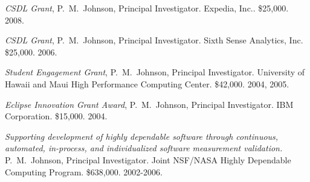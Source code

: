 \begin{Awarded Grant Support}

\item {\em CSDL Grant}, P.~M.~Johnson, Principal Investigator. Expedia, Inc..  \$25,000. 2008.

\item {\em CSDL Grant}, P.~M.~Johnson, Principal Investigator. Sixth Sense Analytics, Inc.  \$25,000. 2006.

\item {\em Student Engagement Grant}, P.~M.~Johnson, Principal
Investigator. University of Hawaii and Maui High Performance Computing Center.  \$42,000. 2004, 2005.

\item {\em Eclipse Innovation Grant Award}, P.~M.~Johnson, Principal
Investigator.  IBM Corporation. \$15,000. 2004.

\item {\em Supporting development of highly dependable software through
continuous, automated, in-process, and individualized software measurement
validation.}  P.~M.~Johnson, Principal Investigator.  Joint NSF/NASA 
Highly Dependable Computing Program.  \$638,000.  2002-2006.


\end{Awarded Grant Support}

